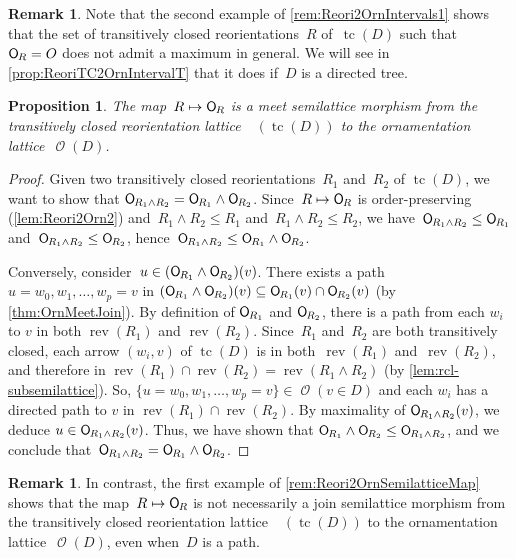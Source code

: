 \documentclass{amsart}
\newtheorem{proposition}[theorem]{Proposition}
\theoremstyle{definition}
\newtheorem{remark}[theorem]{Remark}
\renewcommand{\c}[1]{\mathcal{#1}} %
\DeclareMathOperator{\tc}{tc} %
\newcommand{\meet}{\wedge} %
\newcommand{\mymap}[2]{\mathsf{#1}_{\hspace{-.7pt}#2}}
\DeclareMathOperator{\Orn}{\c{O}}  %
\newcommand{\orn}[1]{\mymap{O}{#1}}  %
\DeclareMathOperator{\Rcl}{\c{R}^{cl}}  %
\DeclareMathOperator{\rev}{rev} %
\begin{document}
\begin{remark}
\label{rem:Reori2OrnIntervals2}
Note that the second example of \cref{rem:Reori2OrnIntervals1} shows that the set of transitively closed reorientations~$R$ of~$\tc(D)$ such that~$\orn{R} = O$ does not admit a maximum in general.
We will see in \cref{prop:ReoriTC2OrnIntervalT} that it does if~$D$ is a directed tree.
\end{remark}

\begin{proposition}
\label{prop:Reori2OrnMeetSemilaticeTC}
The map~$R \mapsto \orn{R}$ is a meet semilattice morphism from the transitively closed reorientation lattice~$\Rcl(\tc(D))$ to the ornamentation lattice~$\Orn(D)$.
\end{proposition}

\begin{proof}
Given two transitively closed reorientations~$R_1$ and~$R_2$ of $\tc(D)$, we want to show that $\orn{R_1 \meet R_2} = \orn{R_1} \meet \orn{R_2}$.
Since~$R \mapsto \orn{R}$ is order-preserving (\cref{lem:Reori2Orn2}) and~$R_1 \meet R_2 \le R_1$ and~$R_1 \meet R_2 \le R_2$, we have~$\orn{R_1 \meet R_2} \le \orn{R_1}$ and~$\orn{R_1 \meet R_2} \le \orn{R_2}$, hence~$\orn{R_1 \meet R_2} \le \orn{R_1} \meet \orn{R_2}$.

Conversely, consider~$u \in (\orn{R_1} \meet \orn{R_2})(v)$.
There exists a path~$u = w_0, w_1, \dots, w_p = v$ in $(\orn{R_1} \meet \orn{R_2})(v) \subseteq \orn{R_1}(v) \cap \orn{R_2}(v)$ (by \cref{thm:OrnMeetJoin}).
By definition of $\orn{R_1}$ and $\orn{R_2}$, there is a path from each $w_i$ to $v$ in both $\rev(R_1)$ and $\rev(R_2)$.
Since~$R_1$ and~$R_2$ are both transitively closed, each arrow $(w_i,v)$ of $\tc(D)$ is in both~$\rev(R_1)$ and~$\rev(R_2)$,
and therefore in $\rev(R_1) \cap \rev(R_2) = \rev(R_1 \meet R_2)$ (by \cref{lem:rcl-subsemilattice}).
So, $\{u = w_0, w_1, \dots, w_p = v\} \in \Orn(v \in D)$ and each $w_i$ has a directed path to $v$ in $\rev(R_1) \cap \rev(R_2)$.
By maximality of $\orn{R_1 \meet R_2}(v)$, we deduce $u \in \orn{R_1 \meet R_2}(v)$.
Thus, we have shown that $\orn{R_1} \meet \orn{R_2} \le \orn{R_1 \meet R_2}$, and we conclude that~$\orn{R_1 \meet R_2} = \orn{R_1} \meet \orn{R_2}$.
\end{proof}

\begin{remark}
In contrast, the first example of \cref{rem:Reori2OrnSemilatticeMap} shows that the map~$R \mapsto \orn{R}$ is not necessarily a join semilattice morphism from the transitively closed reorientation lattice~$\Rcl(\tc(D))$ to the ornamentation lattice~$\Orn(D)$, even when~$D$ is a path.
\end{remark}
\end{document}

